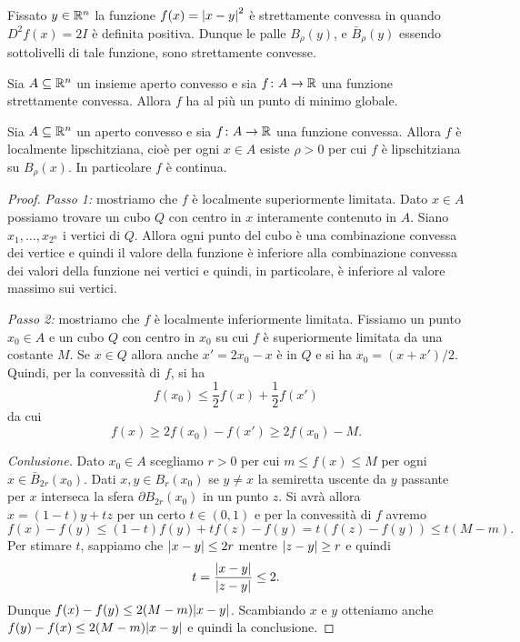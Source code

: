 \begin{example}
Fissato $y\in {\mathbb R}^n$
la funzione $f(x) = {\left|x-y\right|}^2$ 
è strettamente convessa in quando $D^2 f(x) = 2 I$ è definita positiva. 
Dunque le palle $B_\rho(y)$, e $\bar B_\rho(y)$ essendo sottolivelli 
di tale funzione, sono strettamente convesse.
\end{example}

\begin{theorem}
Sia $A\subseteq {\mathbb R}^n$ un insieme aperto convesso e sia $f\colon A \to {\mathbb R}$ una funzione
strettamente convessa. Allora $f$ ha al più un punto di minimo globale.
\end{theorem}

\begin{theorem}
Sia $A\subseteq {\mathbb R}^n$ un aperto convesso e sia $f\colon A \to {\mathbb R}$ una funzione convessa.
Allora $f$ è localmente lipschitziana, cioè per ogni $x\in A$ esiste $\rho >0$ 
per cui $f$ è lipschitziana su $B_\rho(x)$.
In particolare $f$ è continua.
\end{theorem}
\begin{proof}
\emph{Passo 1:} mostriamo che $f$ è localmente superiormente limitata.
Dato $x\in A$ possiamo trovare un cubo $Q$ 
con centro in $x$ interamente contenuto in $A$.
Siano $x_1, \dots, x_{2^n}$ i vertici di $Q$.
Allora ogni punto del cubo è una combinazione convessa 
dei vertice e quindi il valore della funzione 
è inferiore alla combinazione convessa dei valori della funzione nei vertici
e quindi, in particolare, è inferiore al valore massimo 
sui vertici.

\emph{Passo 2:} mostriamo che $f$ è localmente inferiormente limitata.
Fissiamo un punto $x_0\in A$ e un cubo $Q$ con centro in $x_0$ 
su cui $f$ è superiormente limitata da una costante $M$.
Se $x\in Q$ allora anche $x' = 2 x_0 - x$ è in $Q$
e si ha $x_0 = (x+x')/2$. 
Quindi, per la convessità di $f$, si ha 
\[
  f(x_0) \le \frac 1 2 f(x) + \frac 1 2 f(x')
\]
da cui
\[
 f(x) \ge 2 f(x_0) - f(x') \ge 2f(x_0) - M.
\]

\emph{Conlusione.}
Dato $x_0\in A$ scegliamo $r>0$ 
per cui $m \le f(x) \le M$ per ogni $x\in \bar B_{2r}(x_0)$.
Dati $x,y \in B_r(x_0)$ se $y\neq x$ 
la semiretta uscente da $y$ passante per $x$ 
interseca la sfera $\partial B_{2r}(x_0)$ in un punto $z$.
Si avrà allora $x = (1-t) y + t z$ per un certo $t\in (0,1)$
e per la convessità di $f$ avremo 
\[
  f(x) - f(y) 
    \le (1-t) f(y) + t f(z) - f(y) 
    = t (f(z) - f(y))
    \le t (M-m). 
\]
Per stimare $t$, sappiamo che ${\left|x-y\right|}\le 2r$ mentre ${\left|z-y\right|} \ge r$ e quindi
\[
  t = \frac{{\left|x-y\right|}}{{\left|z-y\right|}} \le 2.
\] 
Dunque $f(x) - f(y) \le 2 (M-m) {\left|x-y\right|}$.
Scambiando $x$ e $y$ otteniamo anche $f(y) - f(x) \le 2 (M-m) {\left|x-y\right|}$
e quindi la conclusione.
\end{proof}
  
